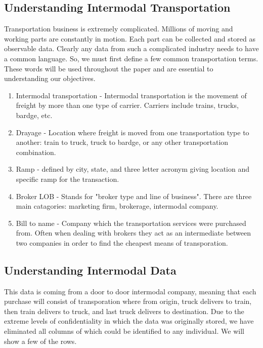 \documentclass{article}\usepackage[]{graphicx}\usepackage[]{color}
\begin{document}
\subsection{Understanding Intermodal Transportation}
Transportation business is extremely complicated. Millions of moving and working parts are constantly in motion. Each part can be collected and stored as observable data. Clearly any data from such a complicated industry needs to have a common language. So, we must first define a few common transportation terms. These words will be used throughout the paper and are essential to understanding our objectives.

\begin{enumerate}
\item
Intermodal transportation - Intermodal transportation is the movement of freight by more than one type of carrier. Carriers include trains, trucks, bardge, etc. \\
\item
Drayage - Location where freight is moved from one transportation type to another: train to truck, truck to bardge, or any other transportation combination. \\
\item
Ramp - defined by city, state, and three letter acronym giving location and specific ramp for the transaction. \\
\item
Broker LOB - Stands for "broker type and line of business". There are three main catagories: marketing firm, brokerage, intermodal company. \\
\item
Bill to name - Company which the transportation services were purchased from. Often when dealing with brokers they act as an intermediate between two companies in order to find the cheapest means of transporation. \\
\end{enumerate}

\subsection{Understanding Intermodal Data}

This data is coming from a door to door intermodal company, meaning that each purchase will consist of transporation where from origin, truck delivers to train, then train delivers to truck, and last truck delivers to destination. Due to the extreme levels of confidentiality in which the data was originally stored, we have eliminated all columns of which could be identified to any individual. We will show a few of the rows.
\end{document}
